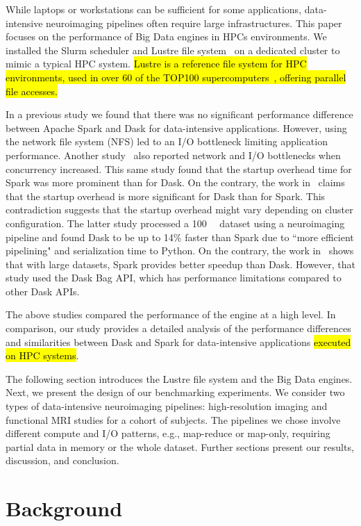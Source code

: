 \documentclass[AMA,STIX1COL]{WileyNJD-v2}
\newcommand{\HL}[1]{\hl{#1}}
\begin{document}
While laptops or workstations can be sufficient for some applications, data-intensive neuroimaging pipelines often require large infrastructures.
This paper focuses on the performance of Big Data engines in HPCs environments.
We installed the Slurm scheduler and Lustre file system~\cite{Braam2019TheLS} on a dedicated cluster to mimic a typical HPC system.
\HL{Lustre is a reference file system for HPC environments, used in over 60 of the TOP100 supercomputers~{\cite{OpenSFS-lustre}}, offering parallel file accesses.}
	
In a previous study\cite{8943502} we found that there was no significant performance difference between Apache Spark and Dask for data-intensive applications.
However, using the network file system (NFS) led to an I/O bottleneck limiting application performance.
Another study~\cite{8588652} also reported network and I/O bottlenecks when concurrency increased.
This same study found that the startup overhead time for Spark was more prominent than for Dask.
On the contrary, the work in~\cite{Mehta:17} claims that the startup overhead is more significant for Dask than for Spark.
This contradiction suggests that the startup overhead might vary depending on cluster configuration.
The latter study processed a \SI{100}{\giga\byte} dataset using a neuroimaging pipeline and found Dask to be up to 14\% faster than Spark due to ``more efficient pipelining" and serialization time to Python.
On the contrary, the work in~\cite{10.1145/3225058.3225128} shows that with large datasets, Spark provides better speedup than Dask.
However, that study used the Dask Bag API, which has performance limitations compared to other Dask APIs.
	
The above studies compared the performance of the engine at a high level.
In comparison, our study provides a detailed analysis of the performance differences
and similarities between Dask and Spark for data-intensive applications \HL{executed on HPC systems}.
	
The following section introduces the Lustre file system and the Big Data engines.
Next, we present the design of our benchmarking experiments.
We consider two types of data-intensive neuroimaging pipelines: high-resolution imaging and functional MRI studies for a cohort of subjects.
The pipelines we chose involve different compute and I/O patterns, e.g., map-reduce or map-only, requiring partial data in memory or the whole dataset.
Further sections present our results, discussion, and conclusion.
	
	
\section{Background}
\end{document}
